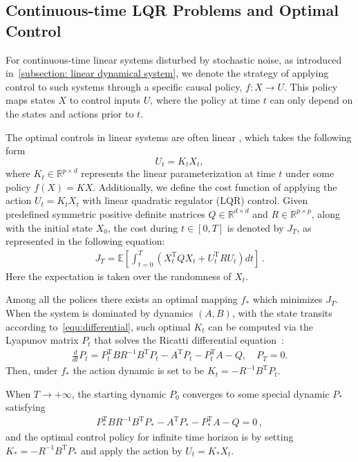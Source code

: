 \documentclass{article}
\theoremstyle{definition}
\begin{document}
\subsection{Continuous-time LQR Problems and Optimal Control}\label{sec:online}


For continuous-time linear systems disturbed by stochastic noise, as introduced in~\ref{subsection: linear dynamical system}, we denote the strategy of applying control to such systems through a specific causal policy, $f: X \to U$. This policy maps states $X$ to control inputs $U$, where the policy at time $t$ can only depend on the states and actions prior to $t$.

The optimal controls in linear systems are often linear \citep{ref18,ref24}, which takes the following form $$U_{t}=K_{t}X_{t},$$ 
where $K_{t}\in \mathbb{R}^{p\times d}$ represents the linear parameterization at time $t$ under some policy $f(X) = KX$. Additionally, we define the cost function of applying the action $U_{t}=K_{t}X_{t}$ with linear quadratic regulator (LQR) control. Given predefined symmetric positive definite matrices $Q\in\mathbb{R}^{d\times d}$ and $R\in\mathbb{R}^{p\times p}$, along with the initial state $X_{0}$, the cost during $t\in[0,T]$ is denoted by $J_{T}$, as represented in the following equation:
\begin{align}\label{eq:cost}
J_{T} = \mathbb{E}\left[\int_{t=0}^{T}\left(X^{\mathrm{T}}_{t}QX_{t}+U_t^{\mathrm{T}}RU_t\right)dt\right]\,.
\end{align}
Here the expectation is taken over the randomness of $X_{t}$.

Among all the polices there exists an optimal mapping $f_{*}$ which minimizes $J_{T}$. When the system is dominated by dynamics $(A,B)$, with the state transits according to~\eqref{equ:differential}, such optimal $K_{t}$ can be computed via the Lyapunov matrix $P_{t}$ that solves the Ricatti differential equation~\citep{ref24}:
\begin{align}\label{eq:ricatti}
\frac{d}{dt}{P}_{t}={P}_{t}^{\mathrm{T}}{B}R^{-1}{B}^{\mathrm{T}}{P}_{t}-{A}^{\mathrm{T}}{P}_{t}-{P}_{t}^{\mathrm{T}}{A}-Q, \quad {P}_{T} = 0.
\end{align}
Then, under $f_{*}$ the action dynamic is set to be  $K_{t}=-R^{-1}B^{\mathrm{T}}P_{t}$.

When $T\to +\infty$, the starting dynamic $P_{0}$ converges to some special dynamic $P_{*}$ satisfying
\begin{align}\label{eq:stationary}
P_{*}^{\mathrm{T}}BR^{-1}B^{\mathrm{T}}P_{*}-A^{\mathrm{T}}P_{*}-P_{*}^{\mathrm{T}}A-Q=0\,,
\end{align}
and the optimal control policy for infinite time horizon is by setting $K_{*}=-R^{-1}B^{\mathrm{T}}P_{*}$ and apply the action by $U_{t}=K_{*}X_{t}$.
\end{document}
